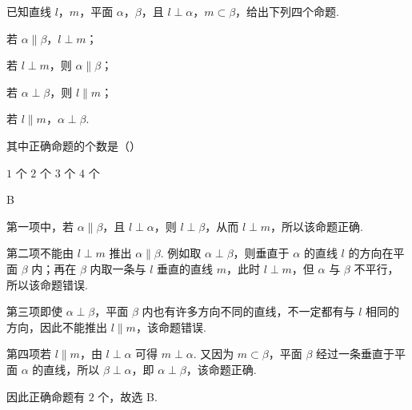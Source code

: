 \begin{problem}
已知直线 \(l\)，\(m\)，平面 \(\alpha\)，\(\beta\)，且 \(l \perp \alpha\)，\(m \subset \beta\)，给出下列四个命题.

\begin{circlelist}
\item 若 \(\alpha \parallel \beta\)，\(l \perp m\)；
\item 若 \(l \perp m\)，则 \(\alpha \parallel \beta\)；
\item 若 \(\alpha \perp \beta\)，则 \(l \parallel m\)；
\item 若 \(l \parallel m\)，\(\alpha \perp \beta\).
\end{circlelist}

其中正确命题的个数是（\quad）

\choices
    {\(1\) 个}
    {\(2\) 个}
    {\(3\) 个}
    {\(4\) 个}

\begin{answer}
B
\end{answer}

\begin{solution}
第一项中，若 \(\alpha\parallel\beta\)，且 \(l\perp\alpha\)，则 \(l\perp\beta\)，从而 \(l\perp m\)，所以该命题正确.

第二项不能由 \(l\perp m\) 推出 \(\alpha\parallel\beta\). 例如取 \(\alpha\perp\beta\)，则垂直于 \(\alpha\) 的直线 \(l\) 的方向在平面 \(\beta\) 内；再在 \(\beta\) 内取一条与 \(l\) 垂直的直线 \(m\)，此时 \(l\perp m\)，但 \(\alpha\) 与 \(\beta\) 不平行，所以该命题错误.

第三项即使 \(\alpha\perp\beta\)，平面 \(\beta\) 内也有许多方向不同的直线，不一定都有与 \(l\) 相同的方向，因此不能推出 \(l\parallel m\)，该命题错误.

第四项若 \(l\parallel m\)，由 \(l\perp\alpha\) 可得 \(m\perp\alpha\). 又因为 \(m\subset\beta\)，平面 \(\beta\) 经过一条垂直于平面 \(\alpha\) 的直线，所以 \(\beta\perp\alpha\)，即 \(\alpha\perp\beta\)，该命题正确.

因此正确命题有 \(2\) 个，故选 B.
\end{solution}
\end{problem}


